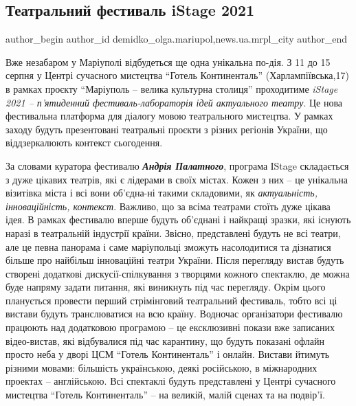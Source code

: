  
 
 
 
 
 
\subsection{Театральний фестиваль iStage 2021}
\label{sec:31_07_2021.stz.news.ua.mrpl_city.1.teatr_festival_istage_2021}
 
\ifcmt
 author_begin
   author_id demidko_olga.mariupol,news.ua.mrpl_city
 author_end
\fi


Вже незабаром у Маріуполі відбудеться ще одна унікальна по\hyp{}дія. З 11 до 15
серпня у Центрі сучасного мистецтва \enquote{Готель Континенталь} (Харлампіївська,17) в
рамках проєкту \enquote{Маріуполь – велика культурна столиця} проходитиме \emph{iStage 2021 –
п'ятиденний фестиваль-лабораторія ідей актуального театру}. Це нова фестивальна
платформа для діалогу мовою театрального мистецтва. У рамках заходу будуть
презентовані театральні проєкти з різних регіонів України, що віддзеркалюють
контекст сьогодення.


За словами куратора фестивалю \emph{\textbf{Андрія Палатного}}, програма ІStage складається з
дуже цікавих театрів, які є лідерами в своїх містах. Кожен з них – це унікальна
візитівка міста і всі вони об'єдна\hyp{}ні такими складовими, як \emph{актуальність,
інноваційність, контекст}. Важливо, що за всіма театрами стоїть дуже цікава
ідея. В рамках фестивалю вперше будуть об'єднані і найкращі зразки, які існують
наразі в театральній індустрії країни. Звісно, представлені будуть не всі
театри, але це певна панорама і саме маріупольці зможуть насолодитися та
дізнатися більше про найбільш інноваційні театри України. Після перегляду
вистав будуть створені додаткові дискусії-спілкування з творцями кожного
спектаклю, де можна буде напряму задати питання, які виникнуть під час
перегляду. Окрім цього планується провести перший стрімінговий театральний
фестиваль, тобто всі ці вистави будуть транслюватися на всю країну. Водночас
організатори фестивалю працюють над додатковою програмою – це ексклюзивні
покази вже записаних відео-вистав, які відбувалися під час карантину, що будуть
показані офлайн просто неба у дворі ЦСМ \enquote{Готель Континенталь} і онлайн. Вистави
йтимуть різними мовами: більшість українською, деякі російською, в міжнародних
проектах –  англійською. Всі спектаклі будуть представлені у Центрі сучасного
мистецтва \enquote{Готель Континенталь} – на великій, малій сценах та на подвір'ї.

